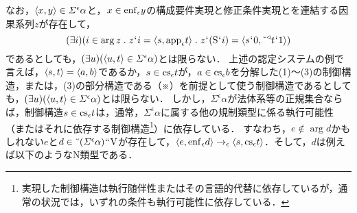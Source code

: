 なお，$ \langle x,y \rangle\in \varSigma^{\epsilon}\alpha $と，$ x\in\mathrm{enf}_{\epsilon}y $の構成要件実現と修正条件実現とを連結する因果系列$ z $が存在して，
\[
    (\exists i)(
        i\in\arg z \con{1}z\fap i = \orp{s,\app{\epsilon} t}\con{1}z\fap(\mathrm{S}\fap i)= \orp{s\fap 0,\tildel{\trgl{t}}\fap 1}
    )
\]
であるとしても，$ (\exists u)(\langle u,t \rangle\in \varSigma^{\epsilon}\alpha) $とは限らない．
上述の認定システムの例で言えば，$ \langle s,t \rangle=\langle a,b \rangle $であるか，$ s\in\mathrm{cs}_{\epsilon}t $が，$ a\in\mathrm{cs}_{\epsilon}b $を分解した(1)〜(3)の制御構造，または，(3)の部分構造である（※）を前提として使う制御構造であるとしても，$ (\exists u)(\langle u,t \rangle\in \varSigma^{\epsilon}\alpha) $とは限らない．
しかし，$ \varSigma^{\epsilon}\alpha $が法体系等の正規集合ならば，制御構造$ s\in\mathrm{cs}_{\epsilon}t $は，通常，$ \varSigma^{\epsilon}\alpha $に属する他の規制類型に係る執行可能性（またはそれに依存する制御構造\footnote{実現した制御構造は執行随伴性またはその言語的代替に依存しているが，通常の状況では，いずれの条件も執行可能性に依存している．}）に依存している．
すなわち，$ e\notin\arg d $かもしれない$ e $と$ d\in \breve{\:\:}(\varSigma^{\epsilon}\alpha){\mspace{1mu}{``}\mspace{1mu}}\mathrm{V} $が存在して，$ \langle e,\mathrm{enf}_{\epsilon}d \rangle\to_{\epsilon}\langle s,\mathrm{cs}_{\epsilon}t \rangle $．そして，$ d $は例えば以下のようなN類型である．

